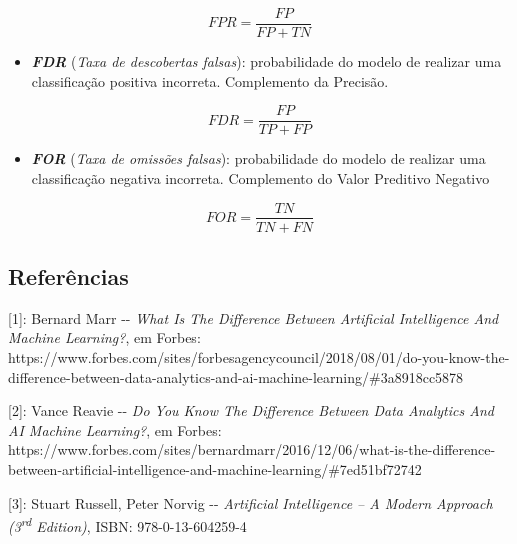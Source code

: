 \documentclass[]{article}
\begin{document}
\[FPR = \frac{FP}{FP + TN}\]

\begin{itemize}
\item
  \textbf{\emph{FDR}} (\emph{Taxa de descobertas falsas}): probabilidade
  do modelo de realizar uma classificação positiva incorreta.
  Complemento da Precisão.
\end{itemize}

\[FDR = \frac{FP}{TP + FP}\]

\begin{itemize}
\item
  \textbf{\emph{FOR}} (\emph{Taxa de omissões falsas}): probabilidade do
  modelo de realizar uma classificação negativa incorreta. Complemento
  do Valor Preditivo Negativo
\end{itemize}

\[FOR = \frac{TN}{TN + FN}\]

\hypertarget{header-n1166}{%
\subsection{Referências}\label{header-n1166}}

{[}1{]}: Bernard Marr -\/- \emph{What Is The Difference Between
Artificial Intelligence And Machine Learning?}, em Forbes:
https://www.forbes.com/sites/forbesagencycouncil/2018/08/01/do-you-know-the-difference-between-data-analytics-and-ai-machine-learning/\#3a8918cc5878

{[}2{]}: Vance Reavie -\/- \emph{Do You Know The Difference Between Data
Analytics And AI Machine Learning?}, em Forbes:
https://www.forbes.com/sites/bernardmarr/2016/12/06/what-is-the-difference-between-artificial-intelligence-and-machine-learning/\#7ed51bf72742

{[}3{]}: Stuart Russell, Peter Norvig -\/- \emph{Artificial Intelligence
-- A Modern Approach (3\textsuperscript{rd} Edition)}, ISBN:
978-0-13-604259-4
\end{document}
